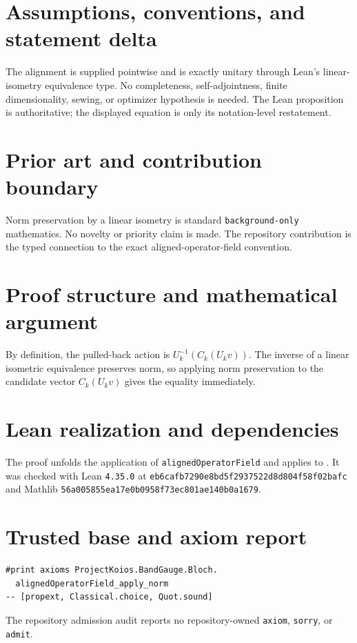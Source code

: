 \documentclass[11pt]{article}
\begin{document}
\section{Assumptions, conventions, and statement delta}
The alignment is supplied pointwise and is exactly unitary through Lean's linear-isometry equivalence type.  No completeness, self-adjointness, finite dimensionality, sewing, or optimizer hypothesis is needed.  The Lean proposition is authoritative; the displayed equation is only its notation-level restatement.

\section{Prior art and contribution boundary}
Norm preservation by a linear isometry is standard \texttt{background-only} mathematics.  No novelty or priority claim is made.  The repository contribution is the typed connection to the exact aligned-operator-field convention.

\section{Proof structure and mathematical argument}
By definition, the pulled-back action is $U_k^{-1}(C_k(U_kv))$.  The inverse of a linear isometric equivalence preserves norm, so applying norm preservation to the candidate vector $C_k(U_kv)$ gives the equality immediately.

\section{Lean realization and dependencies}
The proof unfolds the application of \texttt{alignedOperatorField} and applies
 to .  It was checked with Lean \texttt{4.35.0} at \texttt{eb6cafb7290e8bd5f2937522d8d804f58f02bafc} and Mathlib \texttt{56a005855ea17e0b0958f73ec801ae140b0a1679}.

\section{Trusted base and axiom report}
\begin{verbatim}
#print axioms ProjectKoios.BandGauge.Bloch.
  alignedOperatorField_apply_norm
-- [propext, Classical.choice, Quot.sound]
\end{verbatim}
The repository admission audit reports no repository-owned \texttt{axiom}, \texttt{sorry}, or \texttt{admit}.
\end{document}
